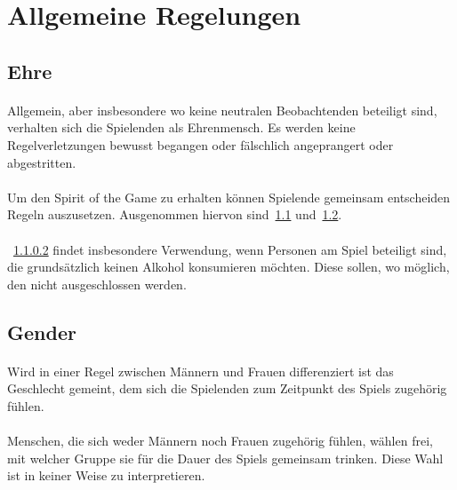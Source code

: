 \section{Allgemeine Regelungen}\label{Allgemeine_Regelungen}

\subsection{Ehre}\label{Allgemeine_Regelungen:Ehre}
\paragraph{} Allgemein, aber insbesondere wo keine neutralen Beobachtenden beteiligt sind, verhalten sich die Spielenden als Ehrenmensch.
Es werden keine Regelverletzungen bewusst begangen oder fälschlich angeprangert oder abgestritten.

\paragraph{}\label{Allgemeine_Regelungen:Ehre:Spirit}
Um den \glqq{} Spirit of the Game\grqq{} zu erhalten können Spielende gemeinsam entscheiden Regeln auszusetzen.
Ausgenommen hiervon sind~\ref{Allgemeine_Regelungen:Ehre} und~\ref{Allgemeine_Regelungen:Gender}.

\paragraph{}
~\ref{Allgemeine_Regelungen:Ehre:Spirit} findet insbesondere Verwendung, wenn Personen am Spiel beteiligt sind, die grundsätzlich keinen Alkohol konsumieren möchten.
Diese sollen, wo möglich, den nicht ausgeschlossen werden.

\subsection{Gender}\label{Allgemeine_Regelungen:Gender}
\paragraph{}
Wird in einer Regel zwischen Männern und Frauen differenziert ist das Geschlecht gemeint, dem sich die Spielenden zum Zeitpunkt des Spiels zugehörig fühlen.

\paragraph{}
Menschen, die sich weder Männern noch Frauen zugehörig fühlen, wählen frei, mit welcher Gruppe sie für die Dauer des Spiels gemeinsam trinken.
Diese Wahl ist in keiner Weise zu interpretieren.

